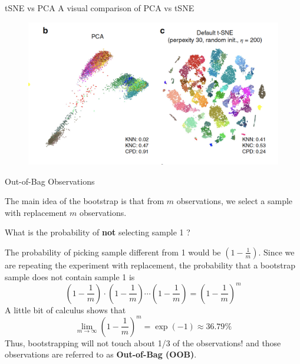 \documentclass{beamer}
\begin{document}
\begin{frame}{tSNE vs PCA}
	A visual comparison of PCA vs tSNE
	
		\begin{figure}[h]
		\centering
		\includegraphics[scale=0.55]{../../Figures/pca_vs_tsne.png}
	\end{figure}	
	
	
\end{frame}
	
	\begin{frame}{Out-of-Bag Observations}
		
		The main idea of the bootstrap is that from $m$ observations, we select a sample with replacement $m$ observations.
		
		What is the probability of {\bf not} selecting sample 1 ?
		
		The probability of picking sample different from 1 would be 
		$(1 - \frac{1}{m})$. Since we are repeating the experiment with replacement, the probability that a bootstrap sample does not contain sample 1 is 
		\begin{equation*}
			\left(1 - \frac{1}{m}\right) \cdot \left(1 - \frac{1}{m}\right) \cdots \left(1 - \frac{1}{m}\right) = \left(1 - \frac{1}{m}\right)^m
		\end{equation*}
		A little bit of calculus shows that 
		\begin{equation*}
			\lim_{m\to\infty}\left(1-\frac{1}{m}\right)^m= \exp(-1) \approx 36.79\%
		\end{equation*}
		Thus, bootstrapping will not touch about 1/3 of the observations!
		and those observations are referred to as {\bf Out-of-Bag (OOB)}.  
	\end{frame}
	
\end{document}
